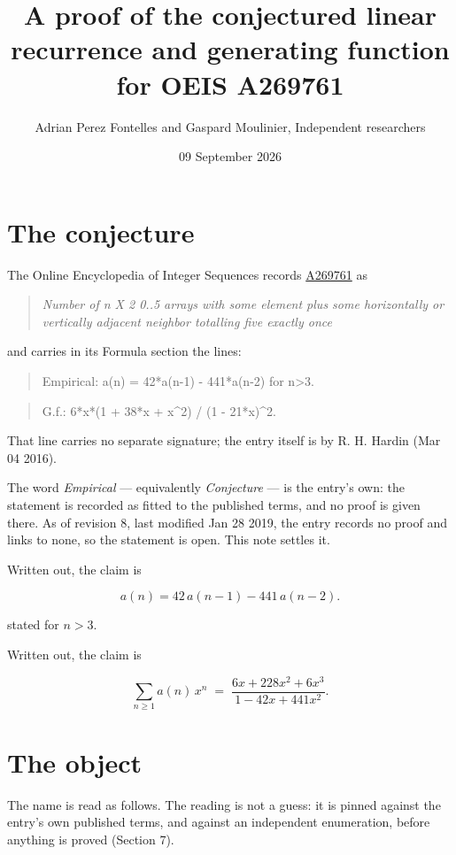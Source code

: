 \documentclass[11pt]{article}
\title{A proof of the conjectured linear recurrence and generating function for OEIS A269761}
\author{Adrian Perez Fontelles and Gaspard Moulinier, Independent researchers}
\date{09 September 2026}
\theoremstyle{definition}
\begin{document}
\maketitle
\section{The conjecture}

The Online Encyclopedia of Integer Sequences records \href{https://oeis.org/A269761}{A269761} as

\begin{quote}\itshape Number of n X 2 0..5 arrays with some element plus some horizontally or vertically adjacent neighbor totalling five exactly once\end{quote}

and carries in its Formula section the lines:

\begin{quote}\ttfamily Empirical: a(n) = 42*a(n-1) - 441*a(n-2) for n>3.\end{quote}

\begin{quote}\ttfamily G.f.: 6*x*(1 + 38*x + x\textasciicircum{}2) / (1 - 21*x)\textasciicircum{}2.\end{quote}

That line carries no separate signature; the entry itself is by R. H. Hardin (Mar 04 2016).

The word {\itshape Empirical} --- equivalently {\itshape Conjecture} --- is the entry's own: the statement is recorded as fitted to the published terms, and no proof is given there. As of revision 8, last modified Jan 28 2019, the entry records no proof and links to none, so the statement is open. This note settles it.

Written out, the claim is

\[a(n) = 42\,a(n-1) - 441\,a(n-2).\]

stated for $n > 3$.

Written out, the claim is

\[\sum_{n \ge 1} a(n)\,x^n \;=\; \frac{6x + 228x^{2} + 6x^{3}}{1 - 42x + 441x^{2}}.\]

\section{The object}

The name is read as follows. The reading is not a guess: it is pinned against the entry's own published terms, and against an independent enumeration, before anything is proved (Section 7).
\end{document}
